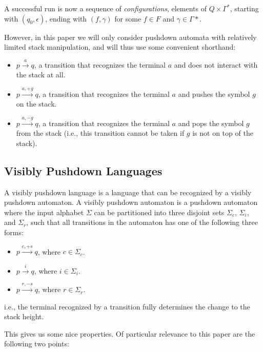 \documentclass[acmsmall,review,anonymous]{acmart}\settopmatter{printfolios=true,printccs=false,printacmref=false}
\begin{document}
\noindent A successful run is now a sequence of \emph{configurations}, elements of $Q \times \Gamma^{*}$, starting with $(q_0, \epsilon)$, ending with $(f, \gamma)$ for some $f \in F$ and $\gamma \in \Gamma*$.

However, in this paper we will only consider pushdown automata with relatively limited stack manipulation, and will thus use some convenient shorthand:

\begin{itemize}
\item $p \xrightarrow{a} q$, a transition that recognizes the terminal $a$ and does not interact with the stack at all.
\item $p \xrightarrow{a, +g} q$, a transition that recognizes the terminal $a$ and pushes the symbol $g$ on the stack.
\item $p \xrightarrow{a, -g} q$, a transition that recognizes the terminal $a$ and pops the symbol $g$ from the stack (i.e., this transition cannot be taken if $g$ is not on top of the stack).
\end{itemize}

\subsection{Visibly Pushdown Languages} \label{sec:preliminaries-vpls}

A visibly pushdown language \cite{alurVisiblyPushdownLanguages2004} is a language that can be recognized by a visibly pushdown automaton. A visibly pushdown automaton is a pushdown automaton where the input alphabet $\Sigma$ can be partitioned into three disjoint sets $\Sigma_c$, $\Sigma_i$, and $\Sigma_r$, such that all transitions in the automaton has one of the following three forms:

\begin{itemize}
\item $p \xrightarrow{c, +s} q$, where $c \in \Sigma_c$.
\item $p \xrightarrow{i} q$, where $i \in \Sigma_i$.
\item $p \xrightarrow{r, -s} q$, where $r \in \Sigma_r$.
\end{itemize}

\noindent i.e., the terminal recognized by a transition fully determines the change to the stack height.

This gives us some nice properties. Of particular relevance to this paper are the following two points:
\end{document}
